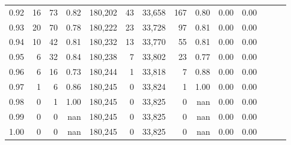 \begin{tabular}{rrrrrrrrrrrrrr}
0.92 &      16 &   73 &  0.82 &  180,202 &       43 &  33,658 &     167 &  0.80 &  0.00 &      0.00 \\
0.93 &      20 &   70 &  0.78 &  180,222 &       23 &  33,728 &      97 &  0.81 &  0.00 &      0.00 \\
0.94 &      10 &   42 &  0.81 &  180,232 &       13 &  33,770 &      55 &  0.81 &  0.00 &      0.00 \\
0.95 &       6 &   32 &  0.84 &  180,238 &        7 &  33,802 &      23 &  0.77 &  0.00 &      0.00 \\
0.96 &       6 &   16 &  0.73 &  180,244 &        1 &  33,818 &       7 &  0.88 &  0.00 &      0.00 \\
0.97 &       1 &    6 &  0.86 &  180,245 &        0 &  33,824 &       1 &  1.00 &  0.00 &      0.00 \\
0.98 &       0 &    1 &  1.00 &  180,245 &        0 &  33,825 &       0 &   nan &  0.00 &      0.00 \\
0.99 &       0 &    0 &   nan &  180,245 &        0 &  33,825 &       0 &   nan &  0.00 &      0.00 \\
1.00 &       0 &    0 &   nan &  180,245 &        0 &  33,825 &       0 &   nan &  0.00 &      0.00 \\
\bottomrule
\end{tabular}
